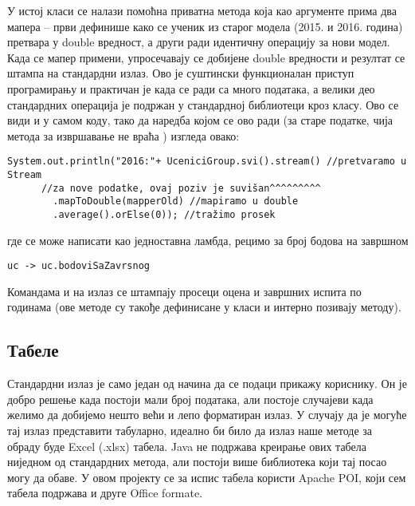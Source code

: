 У истој класи се налази помоћна приватна метода  која као аргументе прима два мапера -- први дефинише како се ученик из старог модела (2015. и 2016. година) претвара у double вредност, а други ради идентичну операцију за нови модел. Када се мапер примени, упросечавају се добијене double вредности и резултат се штампа на стандардни излаз. Ово је суштински функционалан приступ програмирању и практичан је када се ради са много података, а велики део стандардних операција је подржан у стандардној библиотеци кроз  класу. Ово се види и у самом коду, тако да наредба којом се ово ради (за старе податке, чија метода за извршавање не враћа ) изгледа овако:
\begin{verbatim}
System.out.println("2016:"+ UceniciGroup.svi().stream() //pretvaramo u Stream
      //za nove podatke, ovaj poziv je suvišan^^^^^^^^^
        .mapToDouble(mapperOld) //mapiramo u double
        .average().orElse(0)); //tražimo prosek
\end{verbatim}
где се  може написати као једноставна ламбда, рецимо за број бодова на завршном
\begin{verbatim}
uc -> uc.bodoviSaZavrsnog
\end{verbatim}
Командама  и  на излаз се штампају просеци оцена и завршних испита по годинама (ове методе су такође дефинисане у класи  и интерно позивају  методу).

\subsection{Табеле}\label{subs:spreadsheets}

Стандардни излаз је само један од начина да се подаци прикажу кориснику. Он је добро решење када постоји мали број података, али постоје случајеви када желимо да добијемо нешто већи и лепо форматиран излаз. У случају да је могуће тај излаз представити табуларно, идеално би било да излаз наше методе за обраду буде Excel (.xlsx) табела. Java не подржава креирање ових табела ниједном од стандардних метода, али постоји више библиотека који тај посао могу да обаве. У овом пројекту се за испис табела користи Apache POI, који сем табела подржава и друге Office formate.

